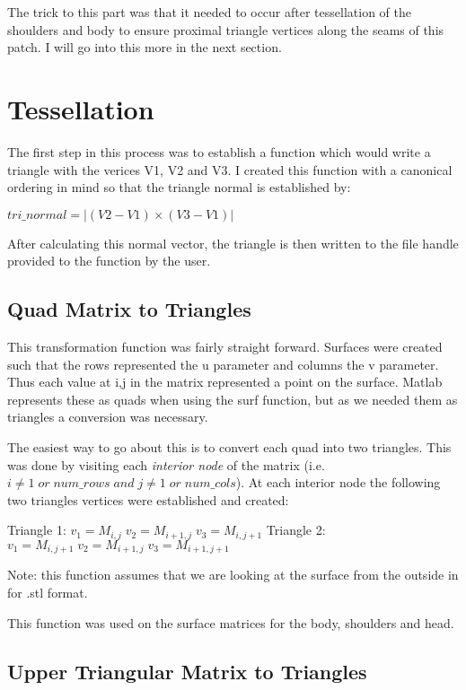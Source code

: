\documentclass[twocolumn]{article}
\begin{document}
The trick to this part was that it needed to occur after tessellation of the shoulders and body to ensure proximal triangle vertices along the seams of this patch. I will go into this more in the next section. 

\section{Tessellation}

The first step in this process was to establish a function which would write a triangle with the verices V1, V2 and V3. I created this function with a canonical ordering in mind so that the triangle normal is established by:

\begin{center}
$ tri\_normal = |(V2-V1) \times (V3-V1)|$
\end{center} 

After calculating this normal vector, the triangle is then written to the file handle provided to the function by the user. 

\subsection{Quad Matrix to Triangles}

This transformation function was fairly straight forward. Surfaces were created such that the rows represented the u parameter and columns the v parameter. Thus each value at i,j in the matrix represented a point on the surface. Matlab represents these as quads when using the surf function, but as we needed them as triangles a conversion was necessary. 

The easiest way to go about this is to convert each quad into two triangles. This was done by visiting each \textit{interior node} of the matrix (i.e. $ i \neq  1 \; or \; num\_rows \; and \; j \neq 1 \; or \; num\_cols $). At each interior node the following two triangles vertices were established and created:

Triangle 1:
$v_1 = M_{i,j} \; v_2= M_{i+1,j} \; v_3 = M_{i,j+1} $
Triangle 2:
$v_1 = M_{i,j+1} \; v_2= M_{i+1,j} \; v_3 = M_{i+1,j+1} $

Note: this function assumes that we are looking at the surface from the outside in for .stl format.

This function was used on the surface matrices for the body, shoulders and head. 

\subsection{Upper Triangular Matrix to Triangles}
\end{document}
